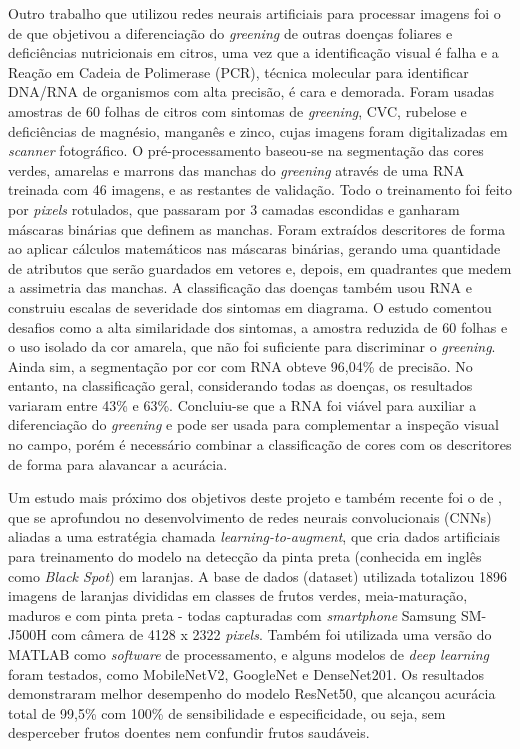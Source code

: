 Outro trabalho que utilizou redes neurais artificiais para processar imagens foi o de \cite{Ribeiro2012} que objetivou a diferenciação do \emph{greening} de outras doenças foliares e deficiências nutricionais em citros, uma vez que a identificação visual é falha e a Reação em Cadeia de Polimerase (PCR), técnica molecular para identificar DNA/RNA de organismos com alta precisão, é cara e demorada. Foram usadas amostras de 60 folhas de citros com sintomas de \emph{greening}, CVC, rubelose e deficiências de magnésio, manganês e zinco, cujas imagens foram digitalizadas em \emph{scanner} fotográfico. O pré-processamento baseou-se na segmentação das cores verdes, amarelas e marrons das manchas do \emph{greening} através de uma RNA treinada com 46 imagens, e as restantes de validação. Todo o treinamento foi feito por \emph{pixels} rotulados, que passaram por 3 camadas escondidas e ganharam máscaras binárias que definem as manchas. Foram extraídos descritores de forma ao aplicar cálculos matemáticos nas máscaras binárias, gerando uma quantidade de atributos que serão guardados em vetores e, depois, em quadrantes que medem a assimetria das manchas. A classificação das doenças também usou RNA e construiu escalas de severidade dos sintomas em diagrama. 
O estudo comentou desafios como a alta similaridade dos sintomas, a amostra reduzida de 60 folhas e o uso isolado da cor amarela, que não foi suficiente para discriminar o \emph{greening}. Ainda sim, a segmentação por cor com RNA obteve 96,04\% de precisão. No entanto, na classificação geral, considerando todas as doenças, os resultados variaram entre 43\% e 63\%. Concluiu-se que a RNA foi viável para auxiliar a diferenciação do \emph{greening} e pode ser usada para complementar a inspeção visual no campo, porém é necessário combinar a classificação de cores com os descritores de forma para alavancar a acurácia.

Um estudo mais próximo dos objetivos deste projeto e também recente foi o de \textcite{Momeny2022}, que se aprofundou no desenvolvimento de redes neurais convolucionais (CNNs) aliadas a uma estratégia chamada \emph{learning-to-augment}, que cria dados artificiais para treinamento do modelo na detecção da pinta preta (conhecida em inglês como \emph{Black Spot}) em laranjas. A base de dados (dataset) utilizada totalizou 1896 imagens de laranjas divididas em classes de frutos verdes, meia-maturação, maduros e com pinta preta - todas capturadas com \emph{smartphone} Samsung SM-J500H com câmera de 4128 x 2322 \emph{pixels}. Também foi utilizada uma versão do MATLAB como \emph{software} de processamento, e alguns modelos de \emph{deep learning} foram testados, como MobileNetV2, GoogleNet e DenseNet201. Os resultados demonstraram melhor desempenho do modelo ResNet50, que alcançou acurácia total de 99,5\% com 100\% de sensibilidade e especificidade, ou seja, sem desperceber frutos doentes nem confundir frutos saudáveis. 
 
